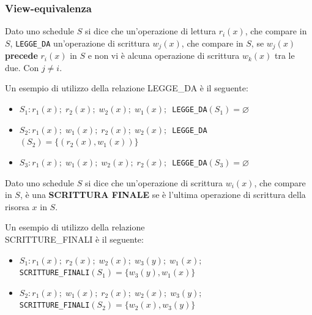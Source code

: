 \documentclass[a4paper,twoside]{article}
\begin{document}
\subsubsection{View-equivalenza}
\begin{definition}
  Dato uno schedule \( S \) si dice che un'operazione di lettura \( r_i(x) \), che
  compare in \( S \), \texttt{LEGGE\_DA} un'operazione di scrittura \( w_j(x) \), che
  compare in \( S \), se \( w_j(x) \) \textbf{precede} \( r_i(x) \) in \( S \) e non
  vi è alcuna operazione di scrittura \( w_k(x) \) tra le due. Con \( j \neq i \).

  \begin{example}
    Un esempio di utilizzo della relazione LEGGE\_DA è il seguente:
    \begin{itemize}
      \item \( S_1: r_1(x);\; r_2(x);\; w_2(x);\; w_1(x);\, \) 
        \texttt{LEGGE\_DA}\( (S_1) = \varnothing \) 

      \item \( S_2: r_1(x);\; w_1(x);\; r_2(x);\; w_2(x);\, \) 
        \texttt{LEGGE\_DA}\( (S_2) = \{ (r_2(x), w_1(x)) \} \)

      \item \( S_3: r_1(x);\; w_1(x);\; w_2(x);\; r_2(x);\, \) 
        \texttt{LEGGE\_DA}\( (S_3) = \varnothing \)
    \end{itemize}
  \end{example}
\end{definition}

\begin{definition}
  Dato uno schedule \( S \) si dice che un'operazione di scrittura \( w_i(x) \), che
  compare in \( S \), è una \textbf{SCRITTURA FINALE} se è l'ultima operazione di
  scrittura della risorsa \( x \) in \( S \).

  \begin{example}
    Un esempio di utilizzo della relazione \\ SCRITTURE\_FINALI è il seguente:
    \begin{itemize}
      \item \( S_1: r_1(x);\; r_2(x);\; w_2(x);\; w_3(y);\; w_1(x); \) \\
        \texttt{SCRITTURE\_FINALI}\( (S_1) = \{ w_3(y), w_1(x) \} \)

      \item \( S_2: r_1(x);\; w_1(x);\; r_2(x);\; w_2(x);\; w_3(y); \) \\
        \texttt{SCRITTURE\_FINALI}\( (S_2) = \{ w_2(x), w_3(y) \} \)
    \end{itemize}
  \end{example}
\end{definition}
\end{document}
